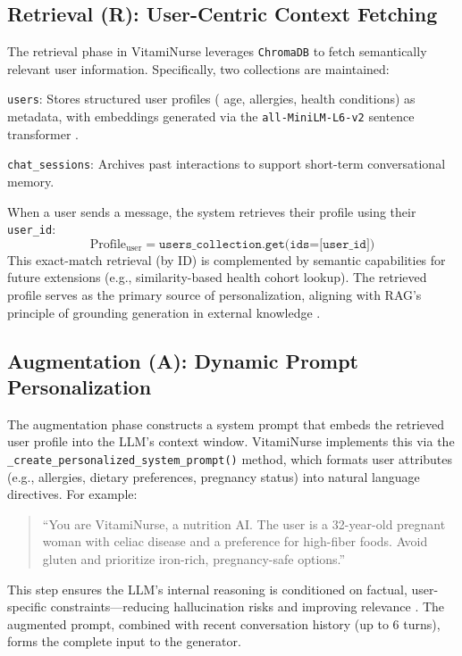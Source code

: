 \subsection{Retrieval (R): User-Centric Context Fetching}
\label{subsec:retrieval}

The retrieval phase in VitamiNurse leverages \texttt{ChromaDB} to fetch semantically relevant user information. Specifically, two collections are maintained:
\item \texttt{users}: Stores structured user profiles ( age, allergies, health conditions) as metadata, with embeddings generated via the \texttt{all-MiniLM-L6-v2} sentence transformer \cite{reimers-gurevych-2019-sentence}.
    \item \texttt{chat\_sessions}: Archives past interactions to support short-term conversational memory.

When a user sends a message, the system retrieves their profile using their \texttt{user\_id}:
\begin{equation}
    \text{Profile}_{\text{user}} = \texttt{users\_collection.get(ids=[user\_id])}
\end{equation}
This exact-match retrieval (by ID) is complemented by semantic capabilities for future extensions (e.g., similarity-based health cohort lookup). The retrieved profile serves as the primary source of personalization, aligning with RAG’s principle of grounding generation in external knowledge \cite{gao2023survey}.

\subsection{Augmentation (A): Dynamic Prompt Personalization}
\label{subsec:augmentation}

The augmentation phase constructs a system prompt that embeds the retrieved user profile into the LLM’s context window. VitamiNurse implements this via the \texttt{\_create\_personalized\_system\_prompt()} method, which formats user attributes (e.g., allergies, dietary preferences, pregnancy status) into natural language directives. For example:

\begin{quote}
    ``You are VitamiNurse, a nutrition AI. The user is a 32-year-old pregnant woman with celiac disease and a preference for high-fiber foods. Avoid gluten and prioritize iron-rich, pregnancy-safe options.''
\end{quote}

This step ensures the LLM’s internal reasoning is conditioned on factual, user-specific constraints—reducing hallucination risks and improving relevance \cite{wang2023personalized}. The augmented prompt, combined with recent conversation history (up to 6 turns), forms the complete input to the generator.

